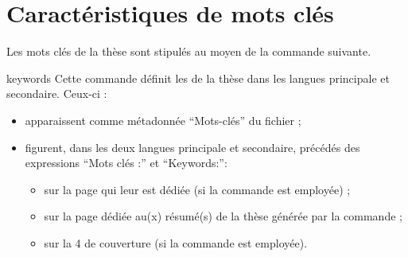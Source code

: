 \section{Caractéristiques de mots clés}
\label{sec-proprietes-de-mots}

Les mots clés de la thèse sont stipulés au moyen de la commande
 suivante.
%
\begin{docCommand}[doc description=\mandatory]{keywords}{}
  Cette commande définit les  de la thèse dans
  les langues principale et secondaire. Ceux-ci :
  \begin{itemize}
  \item apparaissent comme métadonnée \enquote{Mots-clés} du fichier \pdf ;
  \item figurent, dans les deux langues principale et secondaire, précédés des
    expressions \enquote{Mots clés :} et
    \foreignquote{english}{Keywords:}\selonlangue :
    \begin{itemize}
    \item sur la page qui leur est dédiée (si la commande 
      est employée) ;
    \item sur la page dédiée au(x) résumé(s) de la thèse générée par la
      commande  ;
    \item sur la 4\ieme{} de couverture (si la commande 
      est employée).
    \end{itemize}
  \end{itemize}
\end{docCommand}
%
\iffalse
\fi
